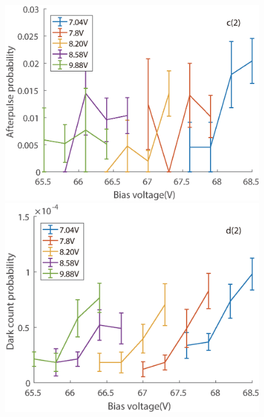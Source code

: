 \documentclass[%
 reprint,
superscriptaddress,
 amsmath,amssymb,
 aps,
]{revtex4-1}
\begin{document}
\begin{figure}
\begin{minipage}{0.24\linewidth}
\includegraphics[width = 1\textwidth]{figure/95M/afterpulse1.eps}%
\end{minipage}
\begin{minipage}{0.24\linewidth}
\centering
\includegraphics[width = 1\textwidth]{figure/95M/darkcount.eps}%
\end{minipage}


\end{figure}
\end{document}
